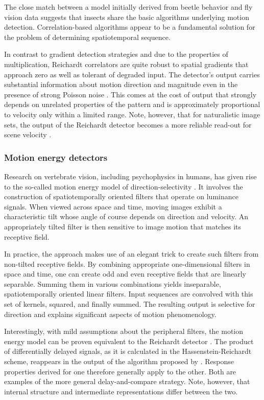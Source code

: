 The close match between a model initially derived from beetle behavior and fly vision data suggests that insects share the basic algorithms underlying motion detection. Correlation-based algorithms appear to be a fundamental solution for the problem of determining spatiotemporal sequence.

In contrast to gradient detection strategies and due to the properties of multiplication, Reichardt correlators are quite robust to spatial gradients that approach zero as well as tolerant of degraded input. The detector's output carries substantial information about motion direction and magnitude even in the presence of strong Poisson noise \citep{Borst:2007gz,Shi:2006du}. This comes at the cost of output that strongly depends on unrelated properties of the pattern and is approximately proportional to velocity only within a limited range. Note, however, that for naturalistic image sets, the output of the Reichardt detector becomes a more reliable read-out for scene velocity \citep{Dror:2000cr,Dror:2001wc}.

\subsubsection{Motion energy detectors}
Research on vertebrate vision, including psychophysics in humans, has given rise to the so-called motion energy model of direction-selectivity \citep{Adelson:1985tx,vanSanten:1984wg}. It involves the construction of spatiotemporally oriented filters that operate on luminance signals. When viewed across space and time, moving images exhibit a characteristic tilt whose angle of course depends on direction and velocity. An appropriately tilted filter is then sensitive to image motion that matches its receptive field.

In practice, the approach makes use of an elegant trick to create such filters from non-tilted receptive fields. By combining appropriate one-dimensional filters in space and time, one can create odd and even receptive fields that are linearly separable. Summing them in various combinations yields inseparable, spatiotemporally oriented linear filters. Input sequences are convolved with this set of kernels, squared, and finally summed. The resulting output is selective for direction and explains significant aspects of motion phenomenology.

Interestingly, with mild assumptions about the peripheral filters, the motion energy model can be proven equivalent to the Reichardt detector \citep{vanSanten:1985ug}. The product of differentially delayed signals, as it is calculated in the Hassenstein-Reichardt scheme, reappears in the output of the algorithm proposed by \citet{Adelson:1985tx}. Response properties derived for one therefore generally apply to the other. Both are examples of the more general delay-and-compare strategy. Note, however, that internal structure and intermediate representations differ between the two.

